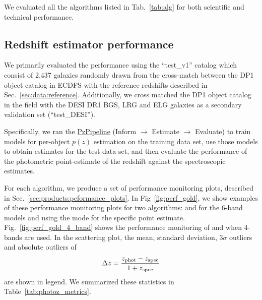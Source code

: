 We evaluated all the algorithms listed in Tab.~\ref{tab:alg} for both scientific and technical performance.

\subsection{Redshift estimator performance}
\label{sec:performance:pz}

We primarily evaluated the performance using the ``test\_v1'' catalog which consist of 2,437 galaxies randomly drawn from the cross-match between the DP1 object catalog in ECDFS with the reference redshifts described in Sec.~\ref{sec:data:reference}.  Additionally, we cross matched the DP1 object catalog in the  field with the DESI DR1 BGS, LRG and ELG galaxies as a secondary validation set (``test\_DESI''). 

Specifically, we ran the \href{https://github.com/LSSTDESC/rail_pipelines/blob/main/src/rail/pipelines/estimation/pz_all.py}{PzPipeline}
(Inform $\rightarrow$ Estimate $\rightarrow$ Evaluate) to train models for per-object $p(z)$ estimation on the training data set, use those models to obtain \photoz estimates for the test data set, and then evaluate the performance of the photometric point-estimate of the redshift against the spectroscopic estimates.

For each algorithm, we produce a set of performance monitoring plots, described in Sec.~\ref{sec:products:peformance_plots}. In Fig~\ref{fig:perf_gold}, we show examples of these performance monitoring plots for two algorithms:  and  for the 6-band models and using the mode for the specific point estimate. Fig.~\ref{fig:perf_gold_4_band} shows the performance monitoring of  and  when 4-bands are used. In the scattering plot, the mean, standard deviation, 3$\sigma$ outliers and absolute outliers of 
\begin{equation}
\label{eq:dz}
    \Delta z = \frac{z_{\rm phot} - z_{\rm spec}}{1+z_{\rm spec}}
\end{equation}
are shown in legend. We summarized these statistics in Table~\ref{tab:photoz_metrics}.

